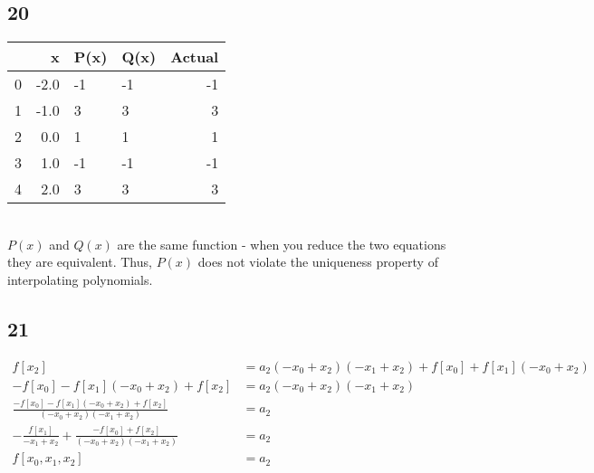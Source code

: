 \documentclass{oisinclass}
\begin{document}
\subsection*{20}
\begin{tabular}{lrllr}
	\toprule
	{} & x    & P(x) & Q(x) & Actual \\
	\midrule
	0  & -2.0 & -1   & -1   & -1     \\
	1  & -1.0 & 3    & 3    & 3      \\
	2  & 0.0  & 1    & 1    & 1      \\
	3  & 1.0  & -1   & -1   & -1     \\
	4  & 2.0  & 3    & 3    & 3      \\
	\bottomrule
\end{tabular} \\
\(P(x)\) and \(Q(x)\) are the same function - when you reduce the two equations they are equivalent. Thus, \(P(x)\) does not violate the uniqueness property of interpolating polynomials.
\subsection*{21}
\begin{align*}
	f[x_{2}]                                                                                                                        & = a_{2} \left(- x_{0} + x_{2}\right) \left(- x_{1} + x_{2}\right) + f[x_{0}] + f[x_{1}] \left(- x_{0} + x_{2}\right) \\
	- f[x_{0}] - f[x_{1}] \left(- x_{0} + x_{2}\right) + f[x_{2}]                                                                   & = a_{2} \left(- x_{0} + x_{2}\right) \left(- x_{1} + x_{2}\right)                                                    \\
	\frac{- f[x_{0}] - f[x_{1}] \left(- x_{0} + x_{2}\right) + f[x_{2}]}{\left(- x_{0} + x_{2}\right) \left(- x_{1} + x_{2}\right)} & = a_{2}                                                                                                              \\
	- \frac{f[x_{1}]}{- x_{1} + x_{2}} + \frac{- f[x_{0}] + f[x_{2}]}{\left(- x_{0} + x_{2}\right) \left(- x_{1} + x_{2}\right)}    & = a_{2}                                                                                                              \\
	f[x_{0},x_{1},x_{2}]                                                                                                            & = a_{2}
\end{align*}
\end{document}
